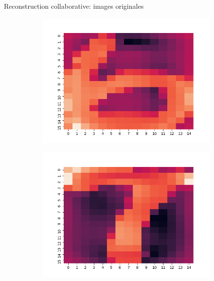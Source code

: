 \documentclass[hyperref={pdfpagelabels=false}]{beamer}
\begin{document}
\begin{frame}{Reconstruction collaborative: images originales}
\begin{figure}[h]
\begin{subfigure}[c]{0.18\textwidth}
                \includegraphics[scale=.12]{o6}
            \end{subfigure}
            \begin{subfigure}[c]{0.18\textwidth}
                \includegraphics[scale=.12]{o7}
            \end{subfigure}
            \begin{subfigure}[c]{0.18\textwidth}

\end{subfigure}
\end{figure}
\end{frame}
\end{document}
